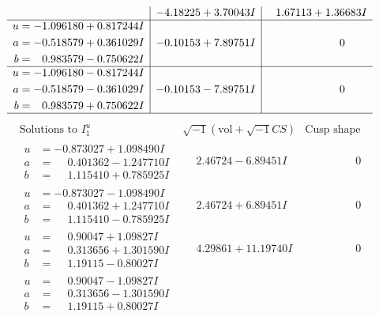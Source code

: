 \documentclass[1p]{elsarticle_modified}
\theoremstyle{definition}
\newcommand{\I}{\sqrt{-1}}
\begin{document}
$$\begin{array}{c|c|c}
 & -4.18225 + 3.70043 I & \phantom{-}1.67113 + 1.36683 I \\ \hline\begin{aligned}
u &= -1.096180 + 0.817244 I \\
a &= -0.518579 + 0.361029 I \\
b &= \phantom{-}0.983579 - 0.750622 I\end{aligned}
 & -0.10153 + 7.89751 I & \phantom{-0.000000 } 0 \\ \hline\begin{aligned}
u &= -1.096180 - 0.817244 I \\
a &= -0.518579 - 0.361029 I \\
b &= \phantom{-}0.983579 + 0.750622 I\end{aligned}
 & -0.10153 - 7.89751 I & \phantom{-0.000000 } 0\\
 \hline 
 \end{array}$$\newpage$$\begin{array}{c|c|c}  
\text{Solutions to }I^u_{1}& \I (\text{vol} + \sqrt{-1}CS) & \text{Cusp shape}\\
 \hline 
\begin{aligned}
u &= -0.873027 + 1.098490 I \\
a &= \phantom{-}0.401362 - 1.247710 I \\
b &= \phantom{-}1.115410 + 0.785925 I\end{aligned}
 & \phantom{-}2.46724 - 6.89451 I & \phantom{-0.000000 } 0 \\ \hline\begin{aligned}
u &= -0.873027 - 1.098490 I \\
a &= \phantom{-}0.401362 + 1.247710 I \\
b &= \phantom{-}1.115410 - 0.785925 I\end{aligned}
 & \phantom{-}2.46724 + 6.89451 I & \phantom{-0.000000 } 0 \\ \hline\begin{aligned}
u &= \phantom{-}0.90047 + 1.09827 I \\
a &= \phantom{-}0.313656 + 1.301590 I \\
b &= \phantom{-}1.19115 - 0.80027 I\end{aligned}
 & \phantom{-}4.29861 + 11.19740 I & \phantom{-0.000000 } 0 \\ \hline\begin{aligned}
u &= \phantom{-}0.90047 - 1.09827 I \\
a &= \phantom{-}0.313656 - 1.301590 I \\
b &= \phantom{-}1.19115 + 0.80027 I\end{aligned}

\end{array}$$
\end{document}
